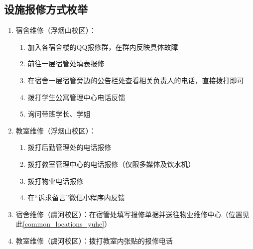 \subsection[设施报修方式枚举]{设施报修方式枚举}
\label{repair_report}
\begin{enumerate}
    \item 宿舍维修（浮烟山校区）：
          \begin{enumerate}
              \item 加入各宿舍楼的QQ报修群，在群内反映具体故障
              \item 前往一层宿管处填表报修
              \item 在宿舍一层宿管旁边的公告栏处查看相关负责人的电话，直接拨打即可
              \item 拨打学生公寓管理中心电话反馈
              \item 询问带班学长、学姐
          \end{enumerate}
    \item 教室维修（浮烟山校区）：
          \begin{enumerate}
              \item 拨打后勤管理处的电话报修
              \item 拨打教室管理中心的电话报修（仅限多媒体及饮水机）
              \item 拨打物业电话报修
              \item 在“诉求留言”微信小程序内反馈
          \end{enumerate}
    \item 宿舍维修（虞河校区）：在宿管处填写报修单据并送往物业维修中心（位置见此\uline{\ref{common_locations_yuhe}}）
    \item 教室维修（虞河校区）：拨打教室内张贴的报修电话
\end{enumerate}

